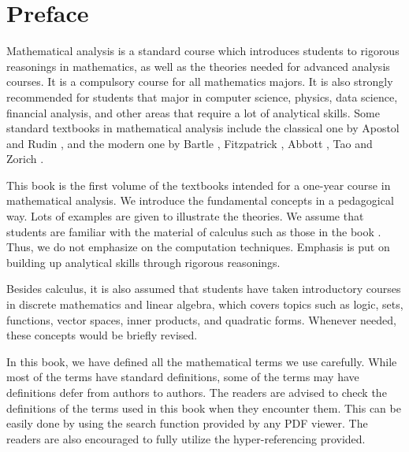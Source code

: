 
\chapter*{Preface}
 
Mathematical analysis is a standard course which introduces students to rigorous reasonings in mathematics, as well as the theories needed for advanced analysis courses. It is a compulsory course for all mathematics majors. It is also strongly recommended for students that major in computer science, physics, data science, financial analysis,  and other areas that require a lot of analytical skills. Some standard textbooks in mathematical analysis include the classical one by  Apostol \cite{Apostol} and Rudin \cite{Rudin}, and the modern one by Bartle \cite{Bartle}, Fitzpatrick \cite{Fitzpatrick}, Abbott \cite{Abbott}, Tao \cite{Tao_1, Tao_2} and Zorich \cite{Zorich_1, Zorich_2}.
 
 This book is the first volume of the textbooks intended for a one-year course in mathematical analysis.   We introduce the fundamental concepts in a pedagogical way. Lots of examples are given to illustrate the theories. 
We assume that students are familiar with the material of calculus such as those in the book \cite{Stewart}. Thus, we do not emphasize on the computation techniques. Emphasis is put on building up  analytical skills through rigorous reasonings. 

Besides calculus, it is also assumed that students have taken introductory courses in discrete mathematics and linear algebra, which covers topics such as logic, sets, functions, vector spaces, inner products, and quadratic forms. Whenever needed, these concepts would be briefly revised. 

In this book, we have defined all the mathematical terms we use carefully. While most of the terms have standard definitions, some of the terms may have definitions  defer from authors to authors. The readers are advised to check the definitions of the terms used in this book when they encounter them. This can be easily done by using the search function provided by any PDF viewer. The readers are also encouraged to fully utilize the hyper-referencing provided.




 \vspace{0.9cm}
~\hfill\bookauthor

 

